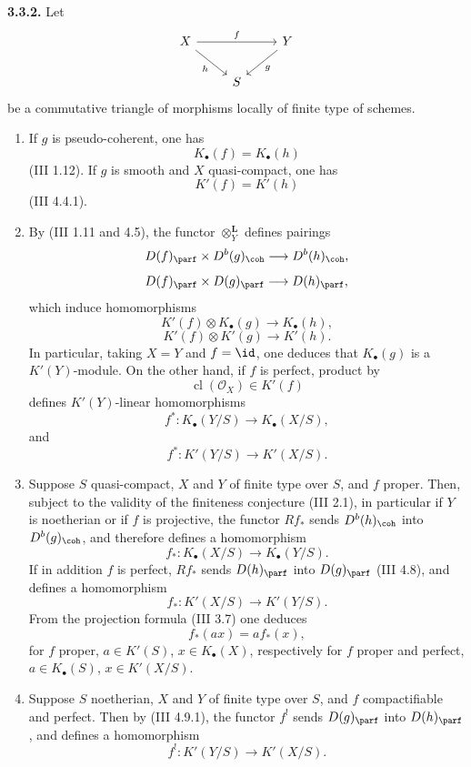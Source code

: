 \documentclass[11pt]{article}
\newcommand{\cl}{\operatorname{cl}}
\begin{document}
\textbf{3.3.2.} Let
\[
\begin{tikzcd}
X\arrow[rr,"f"]\arrow[dr,"h"'] &&Y\arrow[dl,"g"]\\
&S&
\end{tikzcd}
\]
be a commutative triangle of morphisms locally of finite type of schemes.
\begin{enumerate}[label=\textbf{3.3.2.\arabic*.}, leftmargin=4em]
\item If \(g\) is pseudo-coherent, one has
\[
 K_{\bullet}(f)=K_{\bullet}(h)
\]
(III 1.12). If \(g\) is smooth and \(X\) quasi-compact, one has
\[
 K'(f)=K'(h)
\]
(III 4.4.1).

\item By (III 1.11 and 4.5), the functor \(\otimes_Y^{\mathbf L}\) defines pairings
\[
 D(f)_{\parf}\times D^b(g)_{\coh}\longrightarrow D^b(h)_{\coh},
\]
\[
 D(f)_{\parf}\times D(g)_{\parf}\longrightarrow D(h)_{\parf},
\]
which induce homomorphisms
\[
 K'(f)\otimes K_{\bullet}(g)\longrightarrow K_{\bullet}(h),
\]
\[
 K'(f)\otimes K'(g)\longrightarrow K'(h).
\]
In particular, taking \(X=Y\) and \(f=\id\), one deduces that \(K_{\bullet}(g)\) is a \(K'(Y)\)-module. On the other hand, if \(f\) is perfect, product by
\[
 \cl(\mathcal O_X)\in K'(f)
\]
defines \(K'(Y)\)-linear homomorphisms
\[
 f^*:K_{\bullet}(Y/S)\longrightarrow K_{\bullet}(X/S),
\]
and
\[
 f^*:K'(Y/S)\longrightarrow K'(X/S).
\]

\item Suppose \(S\) quasi-compact, \(X\) and \(Y\) of finite type over \(S\), and \(f\) proper. Then, subject to the validity of the finiteness conjecture (III 2.1), in particular if \(Y\) is noetherian or if \(f\) is projective, the functor \(Rf_*\) sends \(D^b(h)_{\coh}\) into \(D^b(g)_{\coh}\), and therefore defines a homomorphism
\[
 f_*:K_{\bullet}(X/S)\longrightarrow K_{\bullet}(Y/S).
\]
If in addition \(f\) is perfect, \(Rf_*\) sends \(D(h)_{\parf}\) into \(D(g)_{\parf}\) (III 4.8), and defines a homomorphism
\[
 f_*:K'(X/S)\longrightarrow K'(Y/S).
\]
From the projection formula (III 3.7) one deduces
\[
 f_*(a x)=a f_*(x),
\]
for \(f\) proper, \(a\in K'(S)\), \(x\in K_{\bullet}(X)\), respectively for \(f\) proper and perfect, \(a\in K_{\bullet}(S)\), \(x\in K'(X/S)\).

\item Suppose \(S\) noetherian, \(X\) and \(Y\) of finite type over \(S\), and \(f\) compactifiable and perfect. Then by (III 4.9.1), the functor \(f^!\) sends \(D(g)_{\parf}\) into \(D(h)_{\parf}\), and defines a homomorphism
\[
 f^!:K'(Y/S)\longrightarrow K'(X/S).
\]
\end{enumerate}
\end{document}
